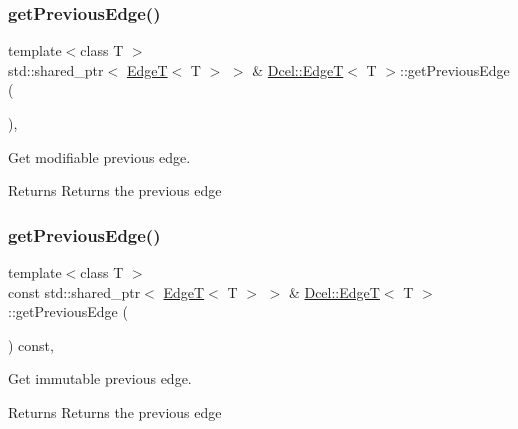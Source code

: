 \subsubsection{\texorpdfstring{get\+Previous\+Edge()}{getPreviousEdge()}\hspace{0.1cm}{\footnotesize\ttfamily [1/2]}}
{\footnotesize\ttfamily template$<$class T $>$ \\
std\+::shared\+\_\+ptr$<$ \hyperlink{classDcel_1_1EdgeT}{EdgeT}$<$ T $>$ $>$ \& \hyperlink{classDcel_1_1EdgeT}{Dcel\+::\+EdgeT}$<$ T $>$\+::get\+Previous\+Edge (\begin{DoxyParamCaption}{ }\end{DoxyParamCaption})\hspace{0.3cm}{\ttfamily [inline]}, {\ttfamily [noexcept]}}



Get modifiable previous edge. 

\begin{DoxyReturn}{Returns}
Returns the previous edge 
\end{DoxyReturn}
\mbox{\label{classDcel_1_1EdgeT_ae4baac4bda30dfa3827ea87f2f72481f}} 
\subsubsection{\texorpdfstring{get\+Previous\+Edge()}{getPreviousEdge()}\hspace{0.1cm}{\footnotesize\ttfamily [2/2]}}
{\footnotesize\ttfamily template$<$class T $>$ \\
const std\+::shared\+\_\+ptr$<$ \hyperlink{classDcel_1_1EdgeT}{EdgeT}$<$ T $>$ $>$ \& \hyperlink{classDcel_1_1EdgeT}{Dcel\+::\+EdgeT}$<$ T $>$\+::get\+Previous\+Edge (\begin{DoxyParamCaption}{ }\end{DoxyParamCaption}) const\hspace{0.3cm}{\ttfamily [inline]}, {\ttfamily [noexcept]}}



Get immutable previous edge. 

\begin{DoxyReturn}{Returns}
Returns the previous edge 
\end{DoxyReturn}
\mbox{\label{classDcel_1_1EdgeT_a44193130714264f57d80e7bfc8264662}} 

